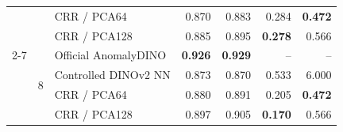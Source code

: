 \begin{table}[t]
\begin{tabular}{ll lrrrr}
& & CRR / PCA64 & 0.870 & 0.883 & 0.284 & \textbf{0.472} \\
& & CRR / PCA128 & 0.885 & 0.895 & \textbf{0.278} & 0.566 \\
\cmidrule(lr){2-7}
& \multirow{4}{*}{8} & Official AnomalyDINO & \textbf{0.926} & \textbf{0.929} & -- & -- \\
& & Controlled DINOv2 NN & 0.873 & 0.870 & 0.533 & 6.000 \\
& & CRR / PCA64 & 0.880 & 0.891 & 0.205 & \textbf{0.472} \\
& & CRR / PCA128 & 0.897 & 0.905 & \textbf{0.170} & 0.566 \\
\bottomrule
\end{tabular}
\end{table}
